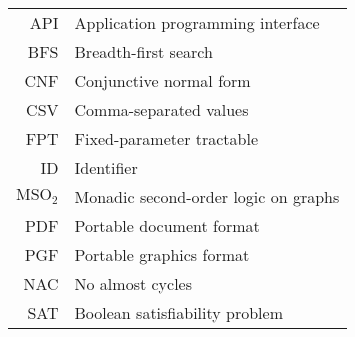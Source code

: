 \documentclass[english,bachelor,unicode,oneside,bw]{ctufit-thesis}
\begin{document}
\tableofcontents %
\listoffigures %
\begingroup
\let\clearpage\relax
\listoftables %
\thectufitlistofalgorithmscommand{}
\endgroup

\chapter{\thectufitabbreviationlabel}

\begin{tabular}{rl}
	API                & Application programming interface    \\
	BFS                & Breadth-first search                 \\
	CNF                & Conjunctive normal form              \\
	CSV                & Comma-separated values               \\
	FPT                & Fixed-parameter tractable            \\
	ID                 & Identifier                           \\
	\( \text{MSO}_2 \) & Monadic second-order logic on graphs \\
	PDF                & Portable document format             \\
	PGF                & Portable graphics format             \\
	NAC                & No almost cycles                     \\
	SAT                & Boolean satisfiability problem       \\
\end{tabular}
\resumeTOCentries{}
\mainmatter\mainmatterinit{} %

\listoftodos{}\newpage{}










% 

\appendix\appendixinit{} %



\backmatter{} %

\printbibliography{}

\end{document}
